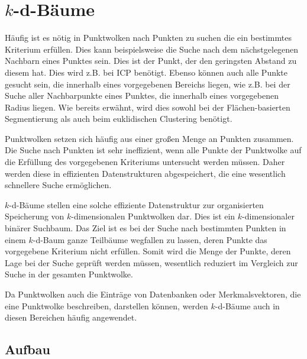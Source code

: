 
\section[$k$-d-Bäume (Schmelzer)]{$k$-d-Bäume}
\label{sec:k-d-baum}

Häufig ist es nötig in Punktwolken nach Punkten zu suchen die ein bestimmtes Kriterium erfüllen. Dies kann beispielsweise die Suche nach dem nächstgelegenen Nachbarn eines Punktes sein. Dies ist der Punkt, der den geringsten Abstand zu diesem hat. Dies wird z.B. bei ICP benötigt. Ebenso können auch alle Punkte gesucht sein, die innerhalb eines vorgegebenen Bereichs liegen, wie z.B. bei der Suche aller Nachbarpunkte eines Punktes, die innerhalb eines vorgegebenen Radius liegen. Wie bereits erwähnt, wird dies sowohl bei der Flächen-basierten Segmentierung als auch beim euklidischen Clustering benötigt. 

Punktwolken setzen sich häufig aus einer großen Menge an Punkten zusammen. Die Suche nach Punkten ist sehr ineffizient, wenn alle Punkte der Punktwolke auf die Erfüllung des vorgegebenen Kriteriums untersucht werden müssen. Daher werden diese in effizienten Datenstrukturen abgespeichert, die eine wesentlich schnellere Suche ermöglichen.

$k$-d-Bäume stellen eine solche effiziente Datenstruktur zur organisierten Speicherung von $k$-dimensionalen Punktwolken dar. Dies ist ein $k$-dimensionaler binärer Suchbaum. Das Ziel ist es bei der Suche nach bestimmten Punkten in einem $k$-d-Baum ganze Teilbäume wegfallen zu lassen, deren Punkte das vorgegebene Kriterium nicht erfüllen. Somit wird die Menge der Punkte, deren Lage bei der Suche geprüft werden müssen, wesentlich reduziert im Vergleich zur  Suche in der gesamten Punktwolke. 

Da Punktwolken auch die Einträge von Datenbanken oder Merkmalsvektoren, die eine Punktwolke beschreiben, darstellen können, werden $k$-d-Bäume auch in diesen Bereichen häufig angewendet. 

\subsection[Aufbau (Schmelzer)]{Aufbau}

